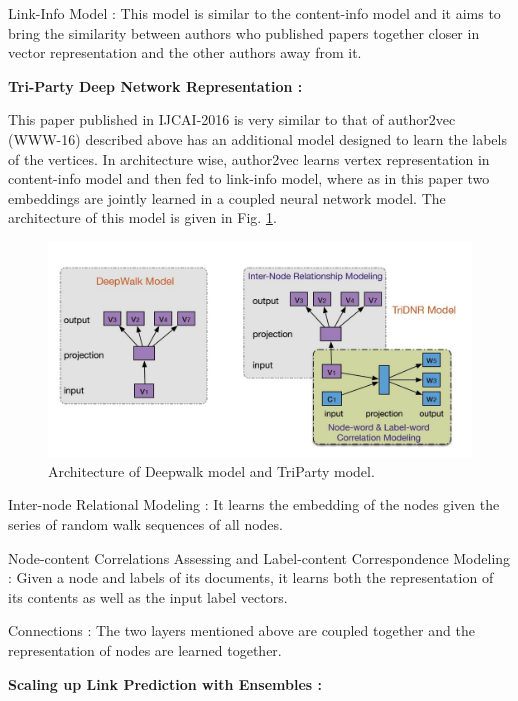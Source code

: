 Link-Info Model : This model is similar to the content-info model and it aims to bring the similarity between authors who published papers together closer in vector representation and the other authors away from it.
\begin{flushleft}
\textbf{Tri-Party Deep Network Representation\cite{triparty} :}
\end{flushleft}

This paper published in IJCAI-2016 is very similar to that of author2vec (WWW-16) \cite{author2vec} described above has an additional model designed to learn the labels of the vertices. In architecture wise, author2vec learns vertex representation in content-info model and then fed to link-info model, where as in this paper two embeddings are jointly learned in a coupled neural network model. The architecture of this model is given in Fig. \ref{fig:triparty}.\\
\begin{figure}[!ht]
	\centering	
	\includegraphics[scale=0.35]{snaps/triparty.jpg}	
	\caption{Architecture of Deepwalk model and TriParty model.\cite{triparty}}
	\label{fig:triparty}
\end{figure}
Inter-node Relational Modeling : It learns the embedding of the nodes given the series of random walk sequences of all nodes.

Node-content Correlations Assessing and Label-content Correspondence Modeling : Given a node and labels of its documents, it learns both the representation of its contents as well as the input label vectors. 

Connections : The two layers mentioned above are coupled together and the representation of nodes are learned together.

\begin{flushleft}
\textbf{Scaling up Link Prediction with Ensembles \cite{scale} :}
\end{flushleft}

